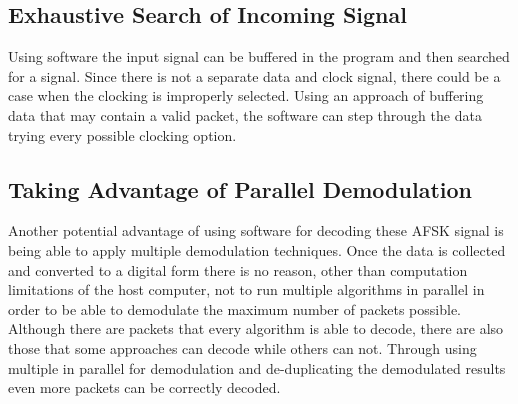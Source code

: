 \subsection{Exhaustive Search of Incoming Signal}
Using software the input signal can be buffered in the program and then searched for a signal. Since there is not a separate data and clock signal, there could be a case when the clocking is improperly selected. Using an approach of buffering data that may contain a valid packet, the software can step through the data trying every possible clocking option.

\subsection{Taking Advantage of Parallel Demodulation}
Another potential advantage of using software for decoding these AFSK signal is being able to apply multiple demodulation techniques. Once the data is collected and converted to a digital form there is no reason, other than computation limitations of the host computer, not to run multiple algorithms in parallel in order to be able to demodulate the maximum number of packets possible. Although there are packets that every algorithm is able to decode, there are also those that some approaches can decode while others can not. Through using multiple in parallel for demodulation and de-duplicating the demodulated results even more packets can be correctly decoded.

